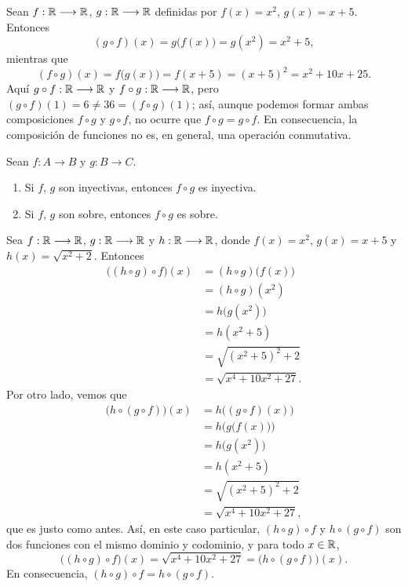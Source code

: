\newpage

\begin{myexample}
    Sean $f: \RR \longrightarrow \RR$, $g: \RR \longrightarrow \RR$ definidas por $f(x) = x^2$, $g(x) = x + 5$. Entonces
    $$(g \circ f)(x) = g\big( f(x) \big) = g\left( x^2 \right) = x^2+5,$$
    mientras que
    $$(f \circ g)(x) = f\big( g(x) \big) = f(x+5) = (x+5)^2 = x^2 + 10x + 25.$$
    Aquí $g \circ f: \RR \longrightarrow \RR$ y $f \circ g: \RR \longrightarrow \RR$, pero $(g \circ f)(1) = 6 \neq 36 = (f \circ g)(1)$; así, aunque podemos formar ambas composiciones $f \circ g$ y $g \circ f$, no ocurre que $f \circ g = g \circ f$. En consecuencia, la composición de funciones no es, en general, una operación conmutativa.
\end{myexample}

\begin{theorem}{}{}
    Sean $f: A \longrightarrow B$ y $g:B \longrightarrow C$.
    \begin{enumerate}[label=\alph*)]
        \item Si $f$, $g$ son inyectivas, entonces $f \circ g$ es inyectiva.
        \item Si $f$, $g$ son sobre, entonces $f \circ g$ es sobre.
    \end{enumerate}
\end{theorem}

\begin{myexample}
    Sea $f: \RR \longrightarrow \RR$, $g: \RR \longrightarrow \RR$ y $h: \RR \longrightarrow \RR$, donde $f(x) = x^2$, $g(x) = x+5$ y $h(x) = \sqrt{x^2+2}$. Entonces
    \begin{align*}
        \big( (h \circ g) \circ f \big)(x) & = (h \circ g)\big( f(x) \big) \\
        & = (h \circ g)\left(x^2\right) \\
        & = h\big(g\left(x^2\right)\big) \\
        & = h\left(x^2+5\right) \\
        & = \sqrt{\left(x^2+5\right)^2+2} \\
        & = \sqrt{x^4+10x^2+27}.
    \end{align*}
    Por otro lado, vemos que
    \begin{align*}
        \big(h \circ (g \circ f) \big)(x) & = h \big( (g \circ f)(x) \big) \\
        & = h \Big( g \big( f(x) \big) \Big) \\
        & = h \big( g\left(x^2\right) \big) \\
        & = h\left(x^2+5\right) \\
        & = \sqrt{\left(x^2+5\right)^2+2} \\
        & = \sqrt{x^4+10x^2+27},
    \end{align*}
    que es justo como antes. Así, en este caso particular, $(h \circ g) \circ f$ y $h \circ (g \circ f)$ son dos funciones con el mismo dominio y codominio, y para todo $x \in \RR$,
    $$\big((h \circ g) \circ f\big)(x) = \sqrt{x^4+10x^2+27} = \big(h \circ (g \circ f) \big)(x).$$
    En consecuencia, $(h \circ g) \circ f= h \circ (g \circ f)$.
\end{myexample}

